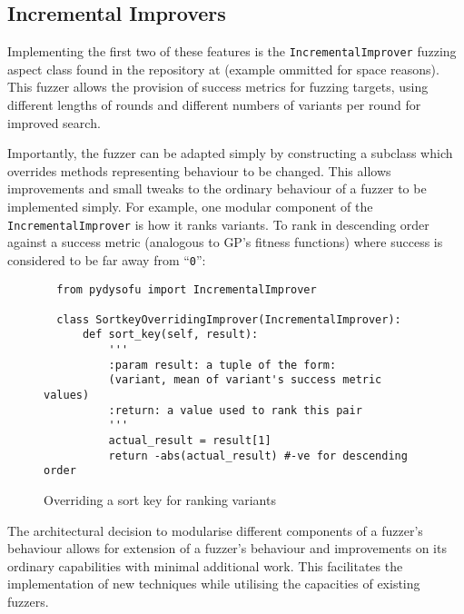 \documentclass[draft,12pt]{llncs}   %
\begin{document}
\subsection{Incremental Improvers}

Implementing the first two of these features is the \texttt{IncrementalImprover}
fuzzing aspect class found in the repository at \cite{pydysofu} (example
ommitted for space reasons). This fuzzer allows the provision of success metrics
for fuzzing targets, using different lengths of rounds and different numbers of
variants per round for improved search. \par

Importantly, the fuzzer can be adapted simply by constructing a subclass which
overrides methods representing behaviour to be changed. This allows improvements
and small tweaks to the ordinary behaviour of a fuzzer to be implemented simply.
For example, one modular component of the \texttt{IncrementalImprover} is how it
ranks variants. To rank in descending order against a success metric (analogous
to GP's fitness functions) where success is considered to be far away from
``\texttt{0}'':

\begin{figure}
  \centering
  \begin{lstlisting}
  from pydysofu import IncrementalImprover

  class SortkeyOverridingImprover(IncrementalImprover):
      def sort_key(self, result):
          '''
          :param result: a tuple of the form:
          (variant, mean of variant's success metric values)
          :return: a value used to rank this pair
          '''
          actual_result = result[1]
          return -abs(actual_result) #-ve for descending order
  \end{lstlisting}
  \caption{Overriding a sort key for ranking variants}
  \label{fig:sort_key_override}
\end{figure}


The architectural decision to modularise different components of a fuzzer's
behaviour allows for extension of a fuzzer's behaviour and improvements on its
ordinary capabilities with minimal additional work. This facilitates the
implementation of new techniques while utilising the capacities of existing
fuzzers.\par
\end{document}
